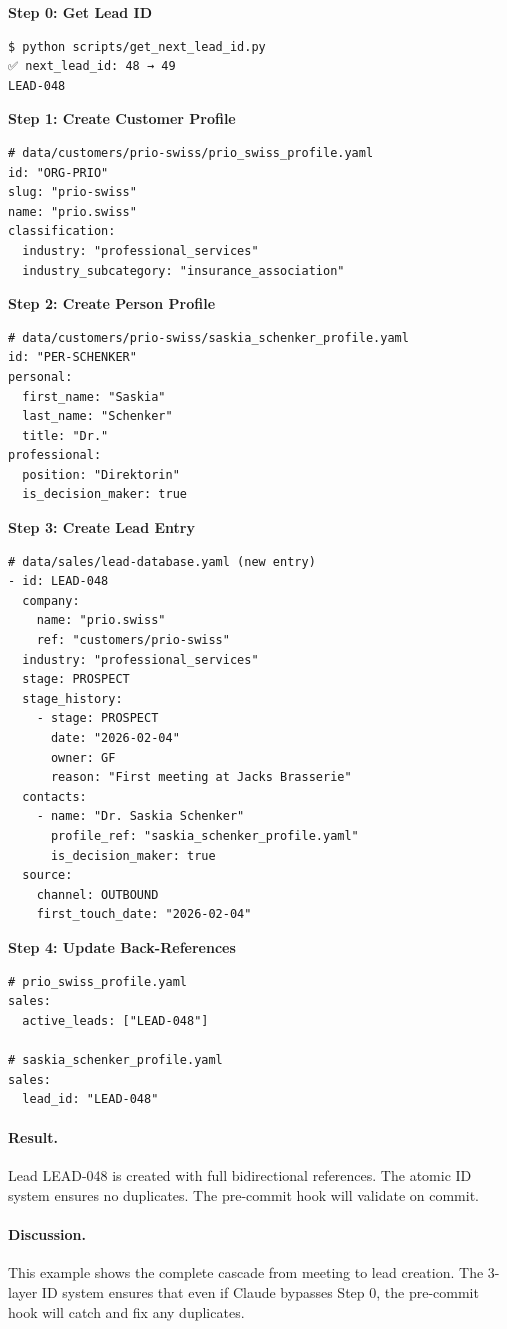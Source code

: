 \textbf{Step 0: Get Lead ID}
\begin{verbatim}
$ python scripts/get_next_lead_id.py
✅ next_lead_id: 48 → 49
LEAD-048
\end{verbatim}

\textbf{Step 1: Create Customer Profile}
\begin{verbatim}
# data/customers/prio-swiss/prio_swiss_profile.yaml
id: "ORG-PRIO"
slug: "prio-swiss"
name: "prio.swiss"
classification:
  industry: "professional_services"
  industry_subcategory: "insurance_association"
\end{verbatim}

\textbf{Step 2: Create Person Profile}
\begin{verbatim}
# data/customers/prio-swiss/saskia_schenker_profile.yaml
id: "PER-SCHENKER"
personal:
  first_name: "Saskia"
  last_name: "Schenker"
  title: "Dr."
professional:
  position: "Direktorin"
  is_decision_maker: true
\end{verbatim}

\textbf{Step 3: Create Lead Entry}
\begin{verbatim}
# data/sales/lead-database.yaml (new entry)
- id: LEAD-048
  company:
    name: "prio.swiss"
    ref: "customers/prio-swiss"
  industry: "professional_services"
  stage: PROSPECT
  stage_history:
    - stage: PROSPECT
      date: "2026-02-04"
      owner: GF
      reason: "First meeting at Jacks Brasserie"
  contacts:
    - name: "Dr. Saskia Schenker"
      profile_ref: "saskia_schenker_profile.yaml"
      is_decision_maker: true
  source:
    channel: OUTBOUND
    first_touch_date: "2026-02-04"
\end{verbatim}

\textbf{Step 4: Update Back-References}
\begin{verbatim}
# prio_swiss_profile.yaml
sales:
  active_leads: ["LEAD-048"]

# saskia_schenker_profile.yaml
sales:
  lead_id: "LEAD-048"
\end{verbatim}

\paragraph{Result.} Lead LEAD-048 is created with full bidirectional references. The atomic ID system ensures no duplicates. The pre-commit hook will validate on commit.

\paragraph{Discussion.} This example shows the complete cascade from meeting to lead creation. The 3-layer ID system ensures that even if Claude bypasses Step 0, the pre-commit hook will catch and fix any duplicates.


